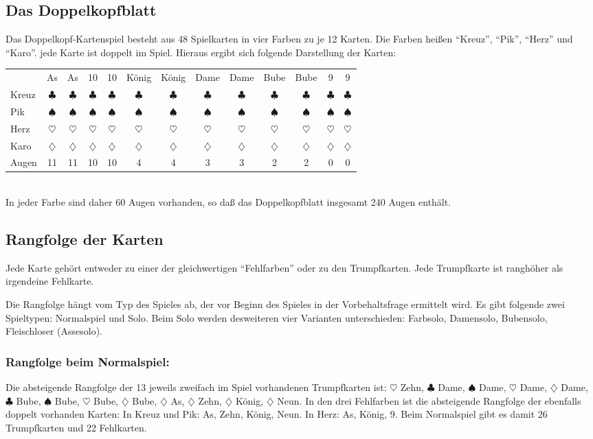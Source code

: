 \documentclass[12pt]{scrartcl}
\newcommand{\kreuz}{$\clubsuit$\xspace}
\newcommand{\pik}{$\spadesuit$\xspace}
\newcommand{\herz}{$\heartsuit$\xspace}
\newcommand{\karo}{$\diamondsuit$\xspace}
\begin{document}
\subsection{Das Doppelkopfblatt}
Das Doppelkopf-Kartenspiel besteht aus 48 Spielkarten in vier
Farben zu je 12 Karten. Die Farben heißen "`Kreuz"', "`Pik"',
"`Herz"' und "`Karo"'. jede Karte ist doppelt im Spiel. Hieraus
ergibt sich folgende Darstellung der Karten:
\\
\begin{tabular}{lcccccccccccc}
  &As     &As     &10     &10     &König &König &Dame   &Dame   &Bube   &Bube   &9   &9\\
  Kreuz &\kreuz &\kreuz &\kreuz &\kreuz &\kreuz &\kreuz &\kreuz &\kreuz &\kreuz &\kreuz &\kreuz &\kreuz \\
  Pik   &\pik   &\pik   &\pik   &\pik   &\pik   &\pik   &\pik   &\pik   &\pik   &\pik   &\pik   &\pik \\
  Herz  &\herz  &\herz  &\herz  &\herz  &\herz  &\herz  &\herz  &\herz  &\herz  &\herz  &\herz  &\herz  \\
  Karo  &\karo  &\karo  &\karo  &\karo  &\karo  &\karo  &\karo  &\karo  &\karo  &\karo  &\karo  &\karo  \\
  Augen & 11    &  11   & 10    &  10   &  4    & 4     &  3    & 3     &  2    &  2    &  0    &  0   \\
\end{tabular}\\
In jeder Farbe sind daher 60 Augen vorhanden, so daß das Doppelkopfblatt insgesamt 240 Augen enthält.

\subsection{Rangfolge der Karten}
Jede Karte gehört entweder zu einer der gleichwertigen
"`Fehlfarben"' oder zu den Trumpfkarten. Jede Trumpfkarte ist
ranghöher als irgendeine Fehlkarte.

Die Rangfolge hängt vom Typ des Spieles ab, der vor Beginn des
Spieles in der Vorbehaltsfrage ermittelt wird. Es gibt folgende
zwei Spieltypen: Normalspiel und Solo. Beim Solo werden
desweiteren vier Varianten unterschieden: Farbsolo, Damensolo,
Bubensolo, Fleischloser (Assesolo).

\subsubsection{Rangfolge beim Normalspiel:}
Die absteigende Rangfolge der 13 jeweils zweifach im Spiel
vorhandenen Trumpfkarten ist: \herz Zehn, \kreuz Dame, \pik Dame,
\herz Dame, \karo Dame, \kreuz Bube, \pik Bube, \herz Bube, \karo
Bube, \karo As, \karo Zehn, \karo König, \karo Neun. In den drei
Fehlfarben ist die absteigende Rangfolge der ebenfalls doppelt
vorhanden Karten: In Kreuz und Pik: As, Zehn, König, Neun. In
Herz: As, König, 9. Beim Normalspiel gibt es damit 26
Trumpfkarten und 22 Fehlkarten.
\end{document}
